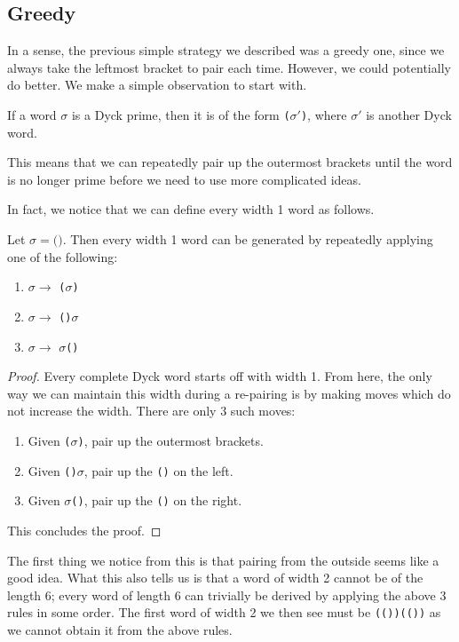 \subsection{Greedy}
In a sense, the previous simple strategy we described was a greedy one, since we always take the leftmost bracket to pair each time. However, we could potentially do better. We make a simple observation to start with.
\begin{observation}
    If a word $\sigma$ is a Dyck prime, then it is of the form \texttt{($\sigma'$)}, where $\sigma'$ is another Dyck word.
\end{observation}
This means that we can repeatedly pair up the outermost brackets until the word is no longer prime before we need to use more complicated ideas.

In fact, we notice that we can define every width 1 word as follows.
\begin{observation}
    Let $\sigma = \texttt{()}$. Then every width 1 word can be generated by repeatedly applying one of the following:
    \begin{enumerate}
        \item $\sigma \rightarrow$ \texttt{($\sigma$)}
        \item $\sigma \rightarrow$ \texttt{()$\sigma$}
        \item $\sigma \rightarrow$ \texttt{$\sigma$()}
    \end{enumerate}
\end{observation}
\begin{proof}
    Every complete Dyck word starts off with width 1. From here, the only way we can maintain this width during a re-pairing is by making moves which do not increase the width. There are only 3 such moves:
    \begin{enumerate}
        \item Given \texttt{($\sigma$)}, pair up the outermost brackets.
        \item Given \texttt{()$\sigma$}, pair up the \texttt{()} on the left.
        \item Given \texttt{$\sigma$()}, pair up the \texttt{()} on the right.
    \end{enumerate}
    This concludes the proof.
\end{proof}

The first thing we notice from this is that pairing from the outside seems like a good idea.
What this also tells us is that a word of width 2 cannot be of the length 6; every word of length 6 can trivially be derived by applying the above 3 rules in some order. The first word of width 2 we then see must be \texttt{(())(())} as we cannot obtain it from the above rules.

